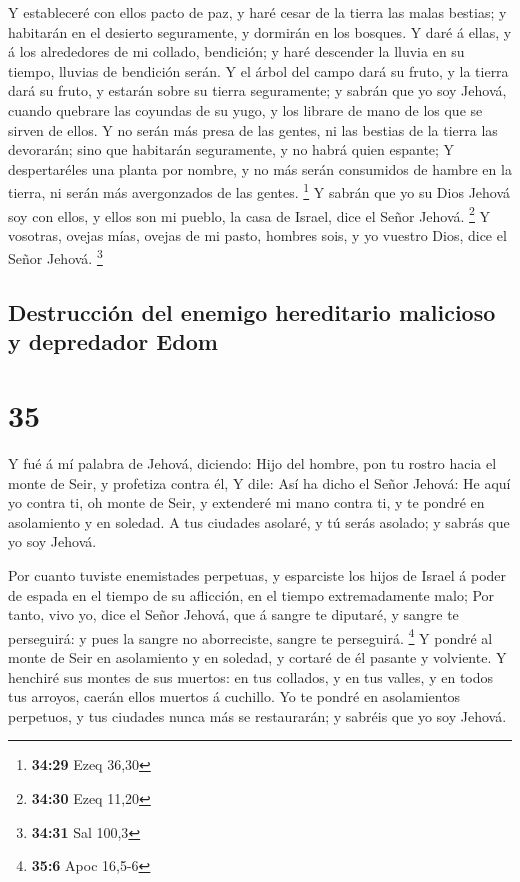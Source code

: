  Y estableceré con ellos pacto de paz, y haré cesar de la
tierra las malas bestias; y habitarán en el desierto seguramente, y
dormirán en los bosques.  Y daré á ellas, y á los
alrededores de mi collado, bendición; y haré descender la lluvia en su
tiempo, lluvias de bendición serán.  Y el árbol del campo
dará su fruto, y la tierra dará su fruto, y estarán sobre su tierra
seguramente; y sabrán que yo soy Jehová, cuando quebrare las coyundas de
su yugo, y los librare de mano de los que se sirven de ellos.
 Y no serán más presa de las gentes, ni las bestias de la
tierra las devorarán; sino que habitarán seguramente, y no habrá quien
espante;  Y despertaréles una planta por nombre, y no más
serán consumidos de hambre en la tierra, ni serán más avergonzados de
las gentes. \footnote{\textbf{34:29} Ezeq 36,30}  Y sabrán
que yo su Dios Jehová soy con ellos, y ellos son mi pueblo, la casa de
Israel, dice el Señor Jehová. \footnote{\textbf{34:30} Ezeq 11,20}
 Y vosotras, ovejas mías, ovejas de mi pasto, hombres sois,
y yo vuestro Dios, dice el Señor Jehová. \footnote{\textbf{34:31} Sal
  100,3}

\hypertarget{destrucciuxf3n-del-enemigo-hereditario-malicioso-y-depredador-edom}{%
\subsection{Destrucción del enemigo hereditario malicioso y depredador
Edom}\label{destrucciuxf3n-del-enemigo-hereditario-malicioso-y-depredador-edom}}

\hypertarget{section-34}{%
\section{35}\label{section-34}}

 Y fué á mí palabra de Jehová, diciendo:  Hijo
del hombre, pon tu rostro hacia el monte de Seir, y profetiza contra él,
 Y dile: Así ha dicho el Señor Jehová: He aquí yo contra ti,
oh monte de Seir, y extenderé mi mano contra ti, y te pondré en
asolamiento y en soledad.  A tus ciudades asolaré, y tú
serás asolado; y sabrás que yo soy Jehová.

 Por cuanto tuviste enemistades perpetuas, y esparciste los
hijos de Israel á poder de espada en el tiempo de su aflicción, en el
tiempo extremadamente malo;  Por tanto, vivo yo, dice el
Señor Jehová, que á sangre te diputaré, y sangre te perseguirá: y pues
la sangre no aborreciste, sangre te perseguirá. \footnote{\textbf{35:6}
  Apoc 16,5-6}  Y pondré al monte de Seir en asolamiento y
en soledad, y cortaré de él pasante y volviente.  Y henchiré
sus montes de sus muertos: en tus collados, y en tus valles, y en todos
tus arroyos, caerán ellos muertos á cuchillo.  Yo te pondré
en asolamientos perpetuos, y tus ciudades nunca más se restaurarán; y
sabréis que yo soy Jehová.

